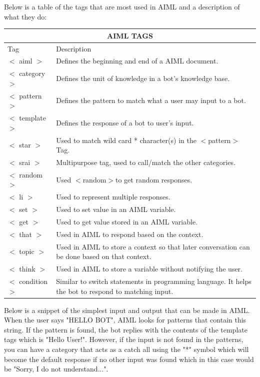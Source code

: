 Below is a table of the tags that are most used in AIML and a description of what they do:\cite{aimltuto63:online}\cite{wallace2003elements}
\newline
\begin{tabular}{ |p{3cm}|p{10cm}|  }
\hline
\multicolumn{2}{|c|}{AIML TAGS} \\
\hline
Tag & Description \\
\hline
$<$ aiml $>$ & Defines the beginning and end of a AIML document. \\
\hline
$<$ category $>$ & Defines the unit of knowledge in a bot's knowledge base. \\
\hline
$<$ pattern $>$ & Defines the pattern to match what a user may input to a bot. \\
\hline
$<$ template $>$ & Defines the response of a bot to user's input. \\
\hline
$<$ star $>$ & Used to match wild card * character(s) in the $<$pattern$>$ Tag. \\
\hline
$<$ srai $>$ & Multipurpose tag, used to call/match the other categories. \\
\hline
$<$ random $>$ & Used $<$random$>$to get random responses. \\
\hline
$<$ li $>$ & Used to represent multiple responses. \\
\hline
$<$ set $>$ & Used to set value in an AIML variable. \\
\hline
$<$ get $>$ & Used to get value stored in an AIML variable. \\
\hline
$<$ that $>$ & Used in AIML to respond based on the context. \\
\hline
$<$ topic $>$ & Used in AIML to store a context so that later conversation can be done based on
that context. \\
\hline
$<$ think $>$ & Used in AIML to store a variable without notifying the user. \\
\hline
$<$ condition $>$ & Similar to switch statements in programming language. It helps the bot to respond
to matching input.\\
\hline
\end{tabular}
\newline
\newline

Below is a snippet of the simplest input and output that can be made in AIML. When the user says "HELLO BOT", AIML looks for patterns that contain this string. If the pattern is found, the bot replies with the contents of the template tags which is "Hello User!". However, if the input is not found in the patterns, you can have a category that acts as a catch all using the "*" symbol which will become the default response if no other input was found which in this case would be "Sorry, I do not understand...".

